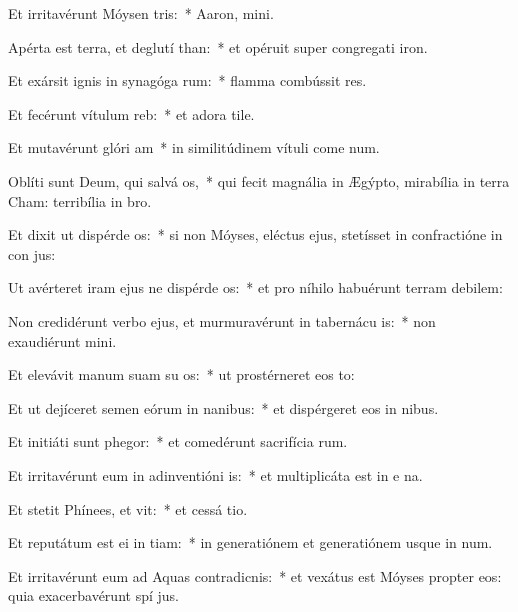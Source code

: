 \item Et irritavérunt Móysen  tris:~* Aaron,  mini.
\item Apérta est terra, et deglutí than:~* et opéruit super congregati iron.
\item Et exársit ignis in synagóga rum:~* flamma combússit res.
\item Et fecérunt vítulum  reb:~* et adora tile.
\item Et mutavérunt glóri am~* in similitúdinem vítuli come num.
\item Oblíti sunt Deum, qui salvá os,~* qui fecit magnália in Ægýpto, mirabília in terra Cham: terribília in  bro.
\item Et dixit ut dispérde os:~* si non Móyses, eléctus ejus, stetísset in confractióne in con jus:
\item Ut avérteret iram ejus ne dispérde os:~* et pro níhilo habuérunt terram debilem:
\item Non credidérunt verbo ejus, et murmuravérunt in tabernácu is:~* non exaudiérunt  mini.
\item Et elevávit manum suam su os:~* ut prostérneret eos  to:
\item Et ut dejíceret semen eórum in nanibus:~* et dispérgeret eos in nibus.
\item Et initiáti sunt phegor:~* et comedérunt sacrifícia rum.
\item Et irritavérunt eum in adinventióni is:~* et multiplicáta est in e na.
\item Et stetit Phínees, et vit:~* et cessá tio.
\item Et reputátum est ei in tiam:~* in generatiónem et generatiónem usque in num.
\item Et irritavérunt eum ad Aquas contradicnis:~* et vexátus est Móyses propter eos: quia exacerbavérunt spí jus.
